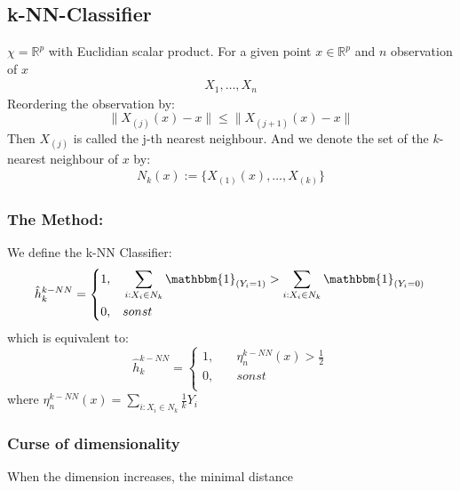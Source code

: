 \subsection{k-NN-Classifier}
\begin{definition}[K-NN]
$\chi = \mathbb{R}^p$ with Euclidian scalar product. For a given point $x \in  \mathbb{R}^p$ and $n$ observation of $x$
\begin{align*}
	X_1, \dots, X_n
\end{align*}
Reordering the observation by:
\begin{equation*}
	\|X_{(j)}(x) - x \| \leq  \| X_{(j + 1)}(x) - x \|
\end{equation*}
Then $X_{(j)}$ is called the j-th nearest neighbour. And we denote the set of the $k$-nearest neighbour of $x$ by:
\begin{align*}
	N_k(x):= \{X_{(1)}(x), \dots , X_{(k)} \}
\end{align*}
	
\end{definition}

\subsubsection*{The Method:}
We define the k-NN Classifier:
\begin{equation*}
	\hat{h}_k^{k-NN} = 
	\left\{ 
	\begin{aligned}
		1, \quad & \sum_{i: X_i \in N_k} \mathbbm{1}_{(Y_i = 1)} > \sum_{i: X_i \in N_k} \mathbbm{1}_{(Y_i = 0)} \\
		0, \quad & sonst \\
	\end{aligned}\right.
\end{equation*}
which is equivalent to:
\begin{equation*}
	\hat{h}_k^{k-NN} = 
	\left\{ 
	\begin{aligned}
		1, \quad & \eta_n^{k-NN}(x) > \frac{1}{2} \\
		0, \quad & sonst \\
	\end{aligned}\right.	
\end{equation*}
where $\eta_n^{k-NN}(x) = \sum_{i: X_i \in N_k} \frac{1}{k} Y_i $

\subsubsection*{Curse of dimensionality}
When the dimension increases, the minimal distance

